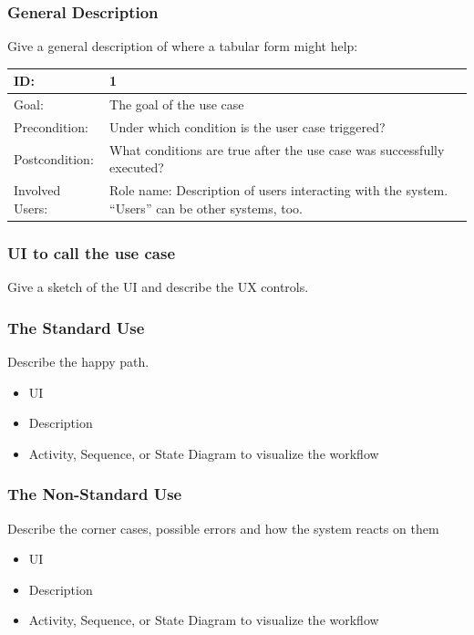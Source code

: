 \documentclass[12pt]{article}
\theoremstyle{definition}
\newenvironment{explanation}{%
   \setlength{\parindent}{0pt}
   \itshape
   \color{blue}
}{}
\begin{document}
\subsubsection{General Description}
\begin{explanation}
Give a general description of where a tabular form might help:
\end{explanation}

\begin{tabular}{|p{.2\linewidth}|p{.65\linewidth}|}
\hline 
ID: & 1 \\ \hline
Goal: & The goal of the use case \\ \hline
Precondition: & Under which condition is the user case triggered? \\ \hline
Postcondition: & What conditions are true after the use case was successfully executed? \\ \hline
Involved Users: &Role name: Description of users interacting with the system. “Users” can be other systems, too. \\ \hline
\end{tabular}

\subsubsection{UI to call the use case}
\begin{explanation}
Give a sketch of the UI and describe the UX controls.
\end{explanation}

\subsubsection{The Standard Use}
\begin{explanation}
Describe the happy path.
\begin{itemize}
	\item UI
	\item Description
	\item Activity, Sequence, or State Diagram to visualize the workflow
\end{itemize}
\end{explanation}

\subsubsection{The Non-Standard Use}
\begin{explanation}
Describe the corner cases, possible errors and how the system reacts on them
\begin{itemize}
	\item UI
	\item Description
	\item Activity, Sequence, or State Diagram to visualize the workflow
\end{itemize}
\end{explanation}
\pagebreak
\end{document}
